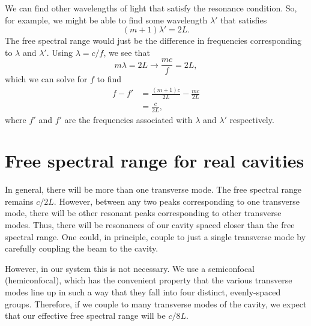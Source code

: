 We can find other wavelengths of light that satisfy the resonance condition. So, for example, we might be able to find some wavelength $\lambda'$ that satisfies
\begin{equation}
(m+1)\lambda'=2L.
\end{equation}
The free spectral range would just be the difference in frequencies corresponding to $\lambda$ and $\lambda'$. Using $\lambda = c/f$, we see that 
\begin{equation}
m\lambda= 2L \rightarrow \frac{mc}{f}=2L,
\end{equation}
which we can solve for $f$ to find 
\begin{align}
f-f'&= \frac{(m+1)c}{2L}-\frac{m c}{2L}\\
&= \frac{c}{2L},
\end{align}
where $f'$ and $f'$ are the frequencies associated with $\lambda$ and $\lambda'$ respectively. 

\section{Free spectral range for real cavities}
In general, there will be more than one transverse mode. The free spectral range remains $c/2L$. However, between any two peaks corresponding to one transverse mode, there will be other resonant peaks corresponding to other transverse modes. Thus, there will be resonances of our cavity spaced closer than the free spectral range. One could, in principle, couple to just a single transverse mode by carefully coupling the beam to the cavity.

However, in our system this is not necessary. We use a semiconfocal (hemiconfocal), which has the convenient property that the various transverse modes line up in such a way that they fall into four distinct, evenly-spaced groups. Therefore, if we couple to many transverse modes of the cavity, we expect that our effective free spectral range will be $c/8L$.

